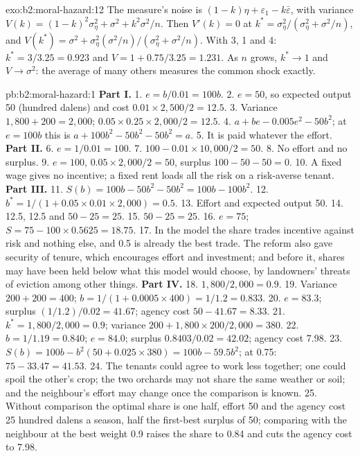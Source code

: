 \begin{solution}{exo:b2:moral-hazard:12}
The measure's noise is $(1 - k)\eta + \varepsilon_1 - k\bar\varepsilon$, with variance $V(k) = (1 - k)^2\sigma_\eta^2 + \sigma^2 + k^2\sigma^2/n$. Then $V'(k) = 0$ at $k^* = \sigma_\eta^2/(\sigma_\eta^2 +
\sigma^2/n)$, and $V(k^*) = \sigma^2 + \sigma_\eta^2(\sigma^2/n)/(\sigma_\eta^2 + \sigma^2/n)$. With 3, 1 and 4: $k^* = 3/3.25 = 0.923$ and $V = 1 + 0.75/3.25 = 1.231$. As $n$ grows, $k^* \to 1$
and $V \to \sigma^2$: the average of many others measures the common shock exactly.
\end{solution}

\begin{solution}{pb:b2:moral-hazard:1}
\textbf{Part I.}
1. $e = b/0.01 = 100b$.
2. $e = 50$, so expected output 50 (hundred dalens) and cost $0.01 \times 2{,}500/2 = 12.5$.
3. Variance $1{,}800 + 200 = 2{,}000$;  $0.05 \times 0.25 \times 2{,}000/2 = 12.5$.
4. $a + be - 0.005e^2 - 50b^2$; at $e = 100b$ this is $a + 100b^2 - 50b^2 - 50b^2 = a$.
5. It is paid whatever the effort.
\textbf{Part II.}
6. $e = 1/0.01 = 100$.
7. $100 - 0.01 \times 10{,}000/2 = 50$.
8. No effort and no surplus.
9. $e = 100$,  $0.05 \times 2{,}000/2 = 50$, surplus $100 - 50 - 50 = 0$.
10. A fixed wage gives no incentive; a fixed rent loads all the risk on a risk-averse tenant.
\textbf{Part III.}
11. $S(b) = 100b - 50b^2 - 50b^2 = 100b - 100b^2$.
12. $b^* = 1/(1 + 0.05 \times 0.01 \times 2{,}000) = 0.5$.
13. Effort and expected output 50.
14. 12.5, 12.5 and $50 - 25 = 25$.
15. $50 - 25 = 25$.
16. $e = 75$; $S = 75 - 100 \times 0.5625 = 18.75$.
17. In the model the share trades incentive against risk and nothing else, and 0.5 is already the best trade. The reform also
gave security of tenure, which encourages effort and investment; and before it, shares may have been held below what
this model would choose, by landowners' threats of eviction among other things.
\textbf{Part IV.}
18. $1{,}800/2{,}000 = 0.9$.
19. Variance $200 + 200 = 400$; $b = 1/(1 + 0.0005 \times 400) = 1/1.2 = 0.833$.
20. $e = 83.3$; surplus $(1/1.2)/0.02 = 41.67$; agency cost $50 - 41.67 = 8.33$.
21. $k^* = 1{,}800/2{,}000 = 0.9$; variance $200 + 1{,}800 \times 200/2{,}000 = 380$.
22. $b = 1/1.19 = 0.840$; $e = 84.0$; surplus $0.8403/0.02 = 42.02$; agency cost 7.98.
23. $S(b) = 100b - b^2(50 + 0.025 \times 380) = 100b - 59.5b^2$; at 0.75: $75 - 33.47 = 41.53$.
24. The tenants could agree to work less together; one could spoil the other's crop; the two orchards may not share the
same weather or soil; and the neighbour's effort may change once the comparison is known.
25. Without comparison the optimal share is one half, effort 50 and the agency cost 25 hundred dalens a season, half the
first-best surplus of 50; comparing with the neighbour at the best weight 0.9 raises the share to 0.84 and cuts the agency
cost to 7.98.
\end{solution}
